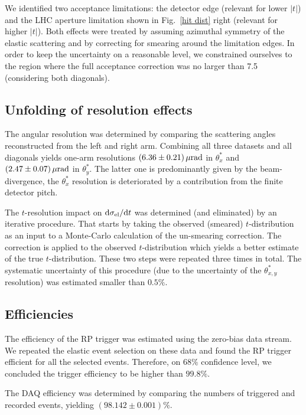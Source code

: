 \documentclass[doublecol]{../macros/epl2}
\def\d{{\rm d}}
\def\un#1{\,{\rm #1}}
\begin{document}
We identified two acceptance limitations: the detector edge (relevant for lower $|t|$) and the LHC aperture limitation shown in Fig.~\ref{hit dist} right (relevant for higher $|t|$). Both effects were treated by assuming azimuthal symmetry of the elastic scattering and by correcting for smearing around the limitation edges. In order to keep the uncertainty on a reasonable level, we constrained ourselves to the region where the full acceptance correction was no larger than 7.5 (considering both diagonals).


\subsection{Unfolding of resolution effects}

The angular resolution was determined by comparing the scattering angles reconstructed from the left and right arm. Combining all three datasets and all diagonals yields one-arm resolutions $(6.36\pm 0.21)\un{\mu rad}$ in $\theta^*_x$ and $(2.47\pm 0.07)\un{\mu rad}$ in $\theta^*_y$. The latter one is predominantly given by the beam-divergence, the $\theta^*_x$ resolution is deteriorated by a contribution from the finite detector pitch.

The $t$-resolution impact on $\d\sigma_{\rm el}/\d t$  was determined (and eliminated) by an iterative procedure. That starts by taking the observed (smeared) $t$-distribution as an input to a Monte-Carlo calculation of the un-smearing correction. The correction is applied to the observed $t$-distribution which yields a better estimate of the true $t$-distribution. These two steps were repeated three times in total. The systematic uncertainty of this procedure (due to the uncertainty of the $\theta^*_{x, y}$ resolution) was estimated smaller than $0.5\%$.

\subsection{Efficiencies}

The efficiency of the RP trigger was estimated using the zero-bias data stream. We repeated the elastic event selection on these data and found the RP trigger efficient for all the selected events. Therefore, on $68\%$ confidence level, we concluded the trigger efficiency to be higher than $99.8\%$.

The DAQ efficiency was determined by comparing the numbers of triggered and recorded events, yielding $(98.142 \pm 0.001)\%$.
\end{document}
